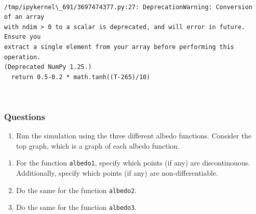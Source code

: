 \documentclass{exam}
\providecommand{\tightlist}{%
      \setlength{\itemsep}{0pt}\setlength{\parskip}{0pt}}
\begin{document}
    \begin{center}
    \end{center}
    { \hspace*{\fill} \\}
    
    \begin{Verbatim}[commandchars=\\\{\}]
/tmp/ipykernel\_691/3697474377.py:27: DeprecationWarning: Conversion of an array
with ndim > 0 to a scalar is deprecated, and will error in future. Ensure you
extract a single element from your array before performing this operation.
(Deprecated NumPy 1.25.)
  return 0.5-0.2 * math.tanh((T-265)/10)
    \end{Verbatim}

    \begin{center}
    \end{center}
    { \hspace*{\fill} \\}
    
    \subsubsection{Questions}\label{questions}

\begin{enumerate}
\def\labelenumi{\arabic{enumi}.}
\tightlist
\item
  Run the simulation using the three different albedo functions.
  Consider the top graph, which is a graph of each albedo function.
\end{enumerate}

\begin{enumerate}
\def\labelenumi{\alph{enumi}.}
\item
  For the function \texttt{albedo1}, specify which points (if any) are
  discontinouous. Additionally, specify which points (if any) are
  non-differentiable.
\item
  Do the same for the function \texttt{albedo2}.
\item
  Do the same for the function \texttt{albedo3}.
\end{enumerate}
\end{document}
